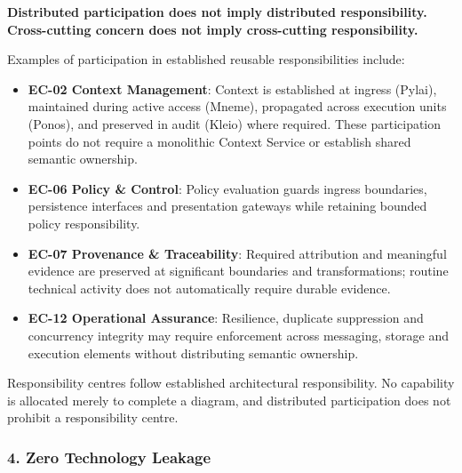 \label{rad:enterprise:58}

\textbf{Distributed participation does not imply distributed responsibility. Cross-cutting concern does not imply cross-cutting responsibility.}

\label{rad:enterprise:60}

Examples of participation in established reusable responsibilities include:

\label{rad:enterprise:61}

\begin{itemize}

\item
\textbf{EC-02 Context Management}: Context is established at ingress (Pylai), maintained during active access (Mneme), propagated across execution units (Ponos), and preserved in audit (Kleio) where required. These participation points do not require a monolithic Context Service or establish shared semantic ownership.



\item
\textbf{EC-06 Policy \& Control}: Policy evaluation guards ingress boundaries, persistence interfaces and presentation gateways while retaining bounded policy responsibility.



\item
\textbf{EC-07 Provenance \& Traceability}: Required attribution and meaningful evidence are preserved at significant boundaries and transformations; routine technical activity does not automatically require durable evidence.



\item
\textbf{EC-12 Operational Assurance}: Resilience, duplicate suppression and concurrency integrity may require enforcement across messaging, storage and execution elements without distributing semantic ownership.



\end{itemize}
\label{rad:enterprise:66}

Responsibility centres follow established architectural responsibility. No capability is allocated merely to complete a diagram, and distributed participation does not prohibit a responsibility centre.

\label{rad:enterprise:68}
\subsubsection*{4. Zero Technology Leakage}
\label{rad:enterprise:69}

